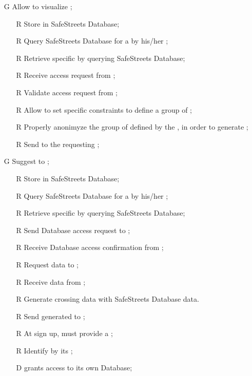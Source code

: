 \documentclass[../../../rasd.tex]{subfiles}
\begin{document}
\begin{itemize}
	\item[G\subs{5}]Allow  to visualize ;
	\begin{itemize}
		\item[R\subs{10}]Store  in SafeStreets Database;
		\item[R\subs{13}]Query SafeStreets Database for a  by his/her ;
		\item[R\subs{14}]Retrieve specific  by querying SafeStreets Database;
		\item[R\subs{20}]Receive  access request from ;
		\item[R\subs{21}]Validate  access request from ;
		\item[R\subs{22}]Allow  to set specific constraints to define a group of ;
		\item[R\subs{23}]Properly anonimyze the group of  defined by the , in order to generate ;
		\item[R\subs{24}]Send  to the requesting ;
	\end{itemize}

	\item[G\subs{6}]Suggest  to ;
	\begin{itemize}
		\item[R\subs{10}]Store  in SafeStreets Database;
		\item[R\subs{13}]Query SafeStreets Database for a  by his/her ;
		\item[R\subs{14}]Retrieve specific  by querying SafeStreets Database;
		\item[R\subs{25}]Send  Database access request to ; 
		\item[R\subs{26}]Receive  Database access confirmation from ;
		\item[R\subs{27}]Request  data to ;
		\item[R\subs{28}]Receive  data from ;
		\item[R\subs{29}]Generate  crossing   data with SafeStreets Database data.
		\item[R\subs{30}]Send generated  to ;
		\item[R\subs{31}]At sign up,  must provide a ;
		\item[R\subs{32}]Identify  by its ;
		\\
		\item[D\subs{8}] grants access to its own  Database;
	\end{itemize}


\end{itemize}
\end{document}
